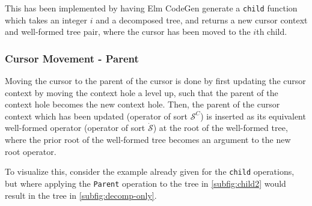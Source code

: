 \documentclass[sigplan]{acmart}
\begin{document}
This has been implemented by having Elm CodeGen generate a \texttt{child} function which
takes an integer $i$ and a decomposed tree, and returns a new cursor context
and well-formed tree pair, where the cursor has been moved to the $i$th child.

\subsubsection{Cursor Movement - Parent}

Moving the cursor to the parent of the cursor is done by first updating the cursor context
by moving the context hole a level up, such that the parent of the context hole
becomes the new context hole. Then, the parent of the cursor context which has
been updated (operator of sort $\mathcal{S}^C$) is inserted as its equivalent
well-formed operator (operator of sort $\dot{\mathcal{S}}$) at the root of the
well-formed tree, where the prior root of the well-formed tree becomes an argument to the new root operator.

To visualize this, consider the example already given for the \texttt{child} operations, but where applying the \texttt{Parent} operation to the tree in \cref{subfig:child2} would result in the tree in \cref{subfig:decomp-only}.
\end{document}
